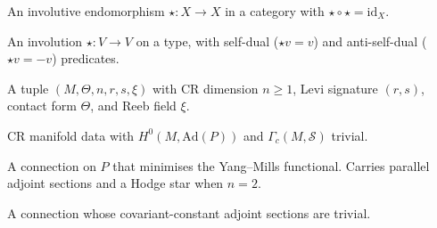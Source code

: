 \begin{definition}
  \label{def:cat-hodge-involution}
  An involutive endomorphism $\star : X \to X$ in a category with
  $\star \circ \star = \mathrm{id}_X$.
\end{definition}

\begin{definition}
  \label{def:hodge-involution}
  An involution $\star : V \to V$ on a type, with self-dual
  ($\star v = v$) and anti-self-dual ($\star v = -v$) predicates.
\end{definition}

\begin{definition}
  \label{def:c-quantum-universe}
  A tuple $(M, \varTheta, n, r, s, \xi)$ with CR dimension $n \ge 1$,
  Levi signature $(r,s)$, contact form $\varTheta$, and Reeb field $\xi$.
\end{definition}

\begin{definition}
  \label{def:c-quantum-observable-universe}
  CR manifold data with $H^0(M,\mathrm{Ad}(P))$ and $\Gamma_c(M,\mathcal{S})$ trivial.
\end{definition}

\begin{definition}
  \label{def:instanton}
  A connection on $P$ that minimises the Yang–Mills functional.
  Carries parallel adjoint sections and a Hodge star when $n=2$.
\end{definition}

\begin{definition}
  \label{def:irreducible-connection}
  A connection whose covariant-constant adjoint sections are trivial.
\end{definition}

